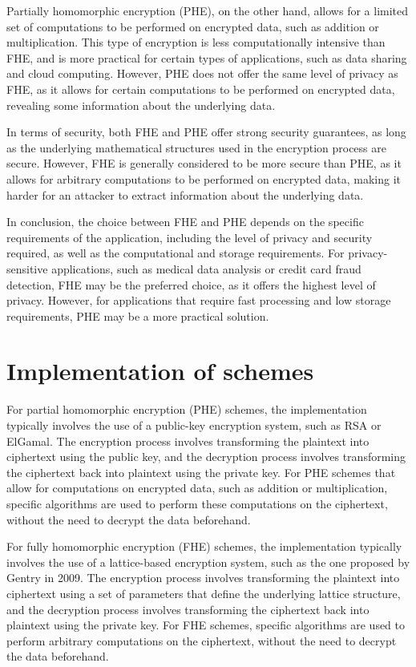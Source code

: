 \documentclass[a4paper,11pt]{report}
\begin{document}
Partially homomorphic encryption (PHE), on the other hand, allows for a limited set of computations to be performed on encrypted data, such as addition or multiplication. This type of encryption is less computationally intensive than FHE, and is more practical for certain types of applications, such as data sharing and cloud computing. However, PHE does not offer the same level of privacy as FHE, as it allows for certain computations to be performed on encrypted data, revealing some information about the underlying data.

In terms of security, both FHE and PHE offer strong security guarantees, as long as the underlying mathematical structures used in the encryption process are secure. However, FHE is generally considered to be more secure than PHE, as it allows for arbitrary computations to be performed on encrypted data, making it harder for an attacker to extract information about the underlying data.

In conclusion, the choice between FHE and PHE depends on the specific requirements of the application, including the level of privacy and security required, as well as the computational and storage requirements. For privacy-sensitive applications, such as medical data analysis or credit card fraud detection, FHE may be the preferred choice, as it offers the highest level of privacy. However, for applications that require fast processing and low storage requirements, PHE may be a more practical solution.
\section{Implementation of schemes}
For partial homomorphic encryption (PHE) schemes, the implementation typically involves the use of a public-key encryption system, such as RSA or ElGamal. The encryption process involves transforming the plaintext into ciphertext using the public key, and the decryption process involves transforming the ciphertext back into plaintext using the private key. For PHE schemes that allow for computations on encrypted data, such as addition or multiplication, specific algorithms are used to perform these computations on the ciphertext, without the need to decrypt the data beforehand.

For fully homomorphic encryption (FHE) schemes, the implementation typically involves the use of a lattice-based encryption system, such as the one proposed by Gentry in 2009. The encryption process involves transforming the plaintext into ciphertext using a set of parameters that define the underlying lattice structure, and the decryption process involves transforming the ciphertext back into plaintext using the private key. For FHE schemes, specific algorithms are used to perform arbitrary computations on the ciphertext, without the need to decrypt the data beforehand.
\end{document}
